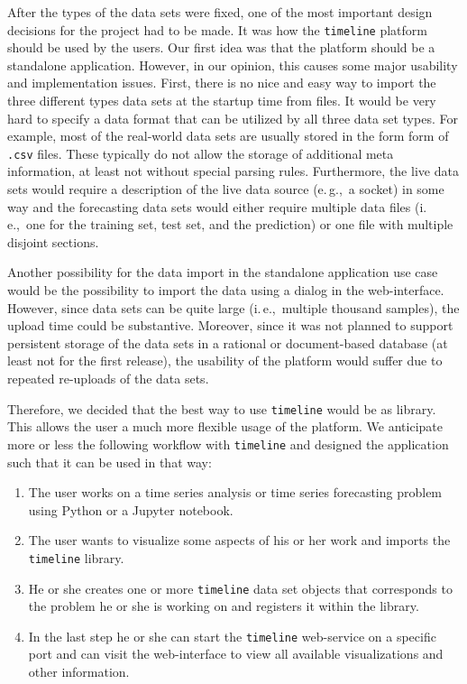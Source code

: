 \documentclass[runningheads,a4paper,11pt]{llncs}
\newcommand{\eg}{e.\,g.,\ }
\newcommand{\ie}{i.\,e.,\ }
\begin{document}
After the types of the data sets were fixed, one of the most important design decisions for the project had to be made. 
It was how the \texttt{timeline} platform should be used by the users.
Our first idea was that the platform should be a standalone application.
However, in our opinion, this causes some major usability and implementation issues.
First, there is no nice and easy way to import the three different types data sets at the startup time from files.
It would be very hard to specify a data format that can be utilized by all three data set types.
For example, most of the real-world data sets are usually stored in the form form of \texttt{.csv} files.
These typically do not allow the storage of additional meta information, at least not without special parsing rules.
Furthermore, the live data sets would require a description of the live data source (\eg a socket) in some way and the forecasting data sets would either require multiple data files (\ie one for the training set, test set, and the prediction) or one file with multiple disjoint sections.

Another possibility for the data import in the standalone application use case would be the possibility to import the data using a dialog in the web-interface.
However, since data sets can be quite large (\ie multiple thousand samples), the upload time could be substantive. 
Moreover, since it was not planned to support persistent storage of the data sets in a rational or document-based database (at least not for the first release), the usability of the platform would suffer due to repeated re-uploads of the data sets. 

Therefore, we decided that the best way to use \texttt{timeline} would be as library. 
This allows the user a much more flexible usage of the platform.
We anticipate more or less the following workflow with \texttt{timeline} and designed the application such that it can be used in that way:

\begin{enumerate}
 \item The user works on a time series analysis or time series forecasting problem using Python or a Jupyter notebook.

 \item The user wants to visualize some aspects of his or her work and imports the \texttt{timeline} library.

 \item He or she creates one or more \texttt{timeline} data set objects that corresponds to the problem he or she is working on and registers it within the library.
 
 \item In the last step he or she can start the \texttt{timeline} web-service on a specific port and can visit the web-interface to view all available visualizations and other information.
\end{enumerate}
\end{document}
